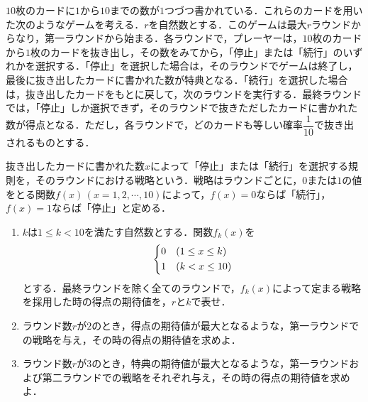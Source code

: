 \documentclass[../../main.tex]{subfiles}
\begin{document}
$10$枚のカードに$1$から$10$までの数が$1$つづつ書かれている．これらのカードを用いた次のようなゲームを考える．$r$を自然数とする．このゲームは最大$r$ラウンドからなり，第一ラウンドから始まる．各ラウンドで，プレーヤーは，$10$枚のカードから$1$枚のカードを抜き出し，その数をみてから，「停止」または「続行」のいずれかを選択する．「停止」を選択した場合は，そのラウンドでゲームは終了し，最後に抜き出したカードに書かれた数が特典となる．「続行」を選択した場合は，抜き出したカードをもとに戻して，次のラウンドを実行する．最終ラウンドでは，「停止」しか選択できず，そのラウンドで抜きただしたカードに書かれた数が得点となる．ただし，各ラウンドで，どのカードも等しい確率$\dfrac{1}{10}$で抜き出されるものとする．

抜き出したカードに書かれた数$x$によって「停止」または「続行」を選択する規則を，そのラウンドにおける戦略という．戦略はラウンドごとに，$0$または$1$の値をとる関数$f(x)\,(x=1,2,\cdots,10)$によって，$f(x)=0$ならば「続行」，$f(x)=1$ならば「停止」と定める．

\begin{enumerate}
  \item $k$は$1\le k < 10$を満たす自然数とする．関数$f_k(x)$を
    \begin{align*}
      \begin{dcases}
        0 & ( 1 \le x \le k) \\
        1 & (k < x \le 10)
      \end{dcases}
    \end{align*}
    とする．最終ラウンドを除く全てのラウンドで，$f_k(x)$によって定まる戦略を採用した時の得点の期待値を，$r$と$k$で表せ．
  \item ラウンド数$r$が$2$のとき，得点の期待値が最大となるような，第一ラウンドでの戦略を与え，その時の得点の期待値を求めよ．
  \item ラウンド数$r$が$3$のとき，特典の期待値が最大となるような，第一ラウンドおよび第二ラウンドでの戦略をそれぞれ与え，その時の得点の期待値を求めよ．
\end{enumerate}
\end{document}
